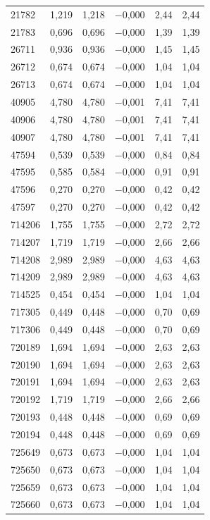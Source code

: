 \begin{longtable}{lccccc}
21782 & 1,219 & 1,218 & $-$0,000 & 2,44 & 2,44 \\
21783 & 0,696 & 0,696 & $-$0,000 & 1,39 & 1,39 \\
26711 & 0,936 & 0,936 & $-$0,000 & 1,45 & 1,45 \\
26712 & 0,674 & 0,674 & $-$0,000 & 1,04 & 1,04 \\
26713 & 0,674 & 0,674 & $-$0,000 & 1,04 & 1,04 \\
40905 & 4,780 & 4,780 & $-$0,001 & 7,41 & 7,41 \\
40906 & 4,780 & 4,780 & $-$0,001 & 7,41 & 7,41 \\
40907 & 4,780 & 4,780 & $-$0,001 & 7,41 & 7,41 \\
47594 & 0,539 & 0,539 & $-$0,000 & 0,84 & 0,84 \\
47595 & 0,585 & 0,584 & $-$0,000 & 0,91 & 0,91 \\
47596 & 0,270 & 0,270 & $-$0,000 & 0,42 & 0,42 \\
47597 & 0,270 & 0,270 & $-$0,000 & 0,42 & 0,42 \\
714206 & 1,755 & 1,755 & $-$0,000 & 2,72 & 2,72 \\
714207 & 1,719 & 1,719 & $-$0,000 & 2,66 & 2,66 \\
714208 & 2,989 & 2,989 & $-$0,000 & 4,63 & 4,63 \\
714209 & 2,989 & 2,989 & $-$0,000 & 4,63 & 4,63 \\
714525 & 0,454 & 0,454 & $-$0,000 & 1,04 & 1,04 \\
717305 & 0,449 & 0,448 & $-$0,000 & 0,70 & 0,69 \\
717306 & 0,449 & 0,448 & $-$0,000 & 0,70 & 0,69 \\
720189 & 1,694 & 1,694 & $-$0,000 & 2,63 & 2,63 \\
720190 & 1,694 & 1,694 & $-$0,000 & 2,63 & 2,63 \\
720191 & 1,694 & 1,694 & $-$0,000 & 2,63 & 2,63 \\
720192 & 1,719 & 1,719 & $-$0,000 & 2,66 & 2,66 \\
720193 & 0,448 & 0,448 & $-$0,000 & 0,69 & 0,69 \\
720194 & 0,448 & 0,448 & $-$0,000 & 0,69 & 0,69 \\
725649 & 0,673 & 0,673 & $-$0,000 & 1,04 & 1,04 \\
725650 & 0,673 & 0,673 & $-$0,000 & 1,04 & 1,04 \\
725659 & 0,673 & 0,673 & $-$0,000 & 1,04 & 1,04 \\
725660 & 0,673 & 0,673 & $-$0,000 & 1,04 & 1,04 \\

\end{longtable}
